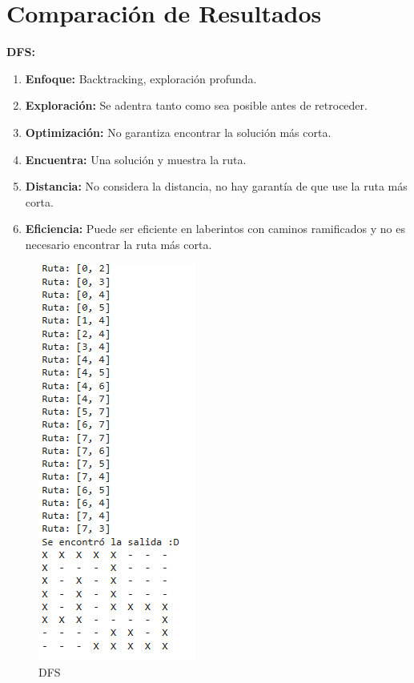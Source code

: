 \section{Comparación de Resultados} 
{\large\textbf{DFS:}}

\begin{enumerate}
    \item \textbf{Enfoque:} Backtracking, exploración profunda.
    \item \textbf{Exploración:} Se adentra tanto como sea posible antes de retroceder.
    \item \textbf{Optimización:} No garantiza encontrar la solución más corta.
    \item \textbf{Encuentra:} Una solución y muestra la ruta.
    \item \textbf{Distancia:} No considera la distancia, no hay garantía de que use la ruta más corta.
    \item \textbf{Eficiencia:} Puede ser eficiente en laberintos con caminos ramificados y no es 
    necesario encontrar la ruta más corta.
\end{enumerate}

\begin{figure}[h]
    \centering
    \includegraphics[scale = .6]{IMA/captuDFS.png}
    \caption{DFS}
    \label{fig:enter-label}
\end{figure}
\vspace{0.5cm}

